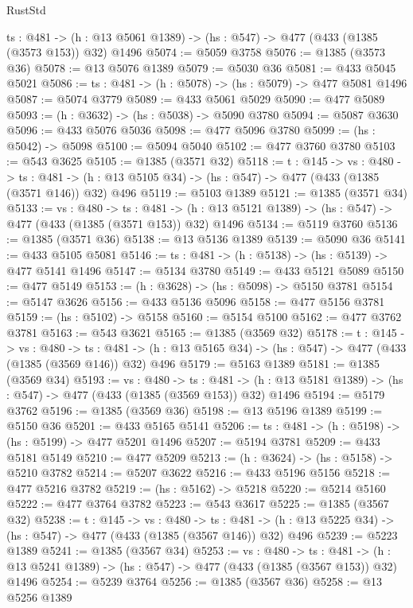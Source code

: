 \begin{lexlean}{RustStd}
\begin{coremodule}
{\begin{coremodule}
{{{{{{{{{{{{{{{{  {ts : @481} -> (h : @13 @5061 @1389) -> (hs : @547) -> @477 (@433 (@1385 (@3573 @153)) @32) @1496
@5074 := @5059 @3758
@5076 := @1385 (@3573 @36)
@5078 := @13 @5076 @1389
@5079 := @5030 @36
@5081 := @433 @5045 @5021
@5086 := {ts : @481} -> (h : @5078) -> (hs : @5079) -> @477 @5081 @1496
@5087 := @5074 @3779
@5089 := @433 @5061 @5029
@5090 := @477 @5089
@5093 := (h : @3632) -> (hs : @5038) -> @5090 @3780
@5094 := @5087 @3630
@5096 := @433 @5076 @5036
@5098 := @477 @5096 @3780
@5099 := (hs : @5042) -> @5098
@5100 := @5094 @5040
@5102 := @477 @3760 @3780
@5103 := @543 @3625
@5105 := @1385 (@3571 @32)
@5118 := {t : @145} ->
  {vs : @480} ->
  {ts : @481} -> (h : @13 @5105 @34) -> (hs : @547) -> @477 (@433 (@1385 (@3571 @146)) @32) @496
@5119 := @5103 @1389
@5121 := @1385 (@3571 @34)
@5133 := {vs : @480} ->
  {ts : @481} -> (h : @13 @5121 @1389) -> (hs : @547) -> @477 (@433 (@1385 (@3571 @153)) @32) @1496
@5134 := @5119 @3760
@5136 := @1385 (@3571 @36)
@5138 := @13 @5136 @1389
@5139 := @5090 @36
@5141 := @433 @5105 @5081
@5146 := {ts : @481} -> (h : @5138) -> (hs : @5139) -> @477 @5141 @1496
@5147 := @5134 @3780
@5149 := @433 @5121 @5089
@5150 := @477 @5149
@5153 := (h : @3628) -> (hs : @5098) -> @5150 @3781
@5154 := @5147 @3626
@5156 := @433 @5136 @5096
@5158 := @477 @5156 @3781
@5159 := (hs : @5102) -> @5158
@5160 := @5154 @5100
@5162 := @477 @3762 @3781
@5163 := @543 @3621
@5165 := @1385 (@3569 @32)
@5178 := {t : @145} ->
  {vs : @480} ->
  {ts : @481} -> (h : @13 @5165 @34) -> (hs : @547) -> @477 (@433 (@1385 (@3569 @146)) @32) @496
@5179 := @5163 @1389
@5181 := @1385 (@3569 @34)
@5193 := {vs : @480} ->
  {ts : @481} -> (h : @13 @5181 @1389) -> (hs : @547) -> @477 (@433 (@1385 (@3569 @153)) @32) @1496
@5194 := @5179 @3762
@5196 := @1385 (@3569 @36)
@5198 := @13 @5196 @1389
@5199 := @5150 @36
@5201 := @433 @5165 @5141
@5206 := {ts : @481} -> (h : @5198) -> (hs : @5199) -> @477 @5201 @1496
@5207 := @5194 @3781
@5209 := @433 @5181 @5149
@5210 := @477 @5209
@5213 := (h : @3624) -> (hs : @5158) -> @5210 @3782
@5214 := @5207 @3622
@5216 := @433 @5196 @5156
@5218 := @477 @5216 @3782
@5219 := (hs : @5162) -> @5218
@5220 := @5214 @5160
@5222 := @477 @3764 @3782
@5223 := @543 @3617
@5225 := @1385 (@3567 @32)
@5238 := {t : @145} ->
  {vs : @480} ->
  {ts : @481} -> (h : @13 @5225 @34) -> (hs : @547) -> @477 (@433 (@1385 (@3567 @146)) @32) @496
@5239 := @5223 @1389
@5241 := @1385 (@3567 @34)
@5253 := {vs : @480} ->
  {ts : @481} -> (h : @13 @5241 @1389) -> (hs : @547) -> @477 (@433 (@1385 (@3567 @153)) @32) @1496
@5254 := @5239 @3764
@5256 := @1385 (@3567 @36)
@5258 := @13 @5256 @1389
}}}}}}}}}}}}}}}}
\end{coremodule}}
\end{coremodule}
\end{lexlean}
